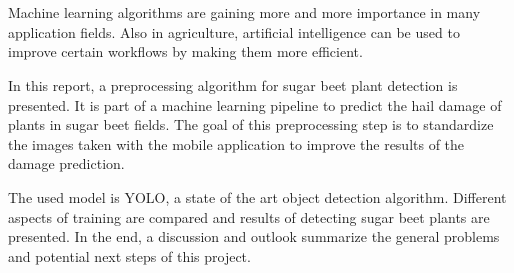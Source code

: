 \chapter{\abstractname}

Machine learning algorithms are gaining more and more importance in many application fields. Also in agriculture, artificial intelligence can be used to improve certain workflows by making them more efficient. 

In this report, a preprocessing algorithm for sugar beet plant detection is presented. It is part of a machine learning pipeline to predict the hail damage of plants in sugar beet fields. The goal of this preprocessing step is to standardize the images taken with the mobile application to improve the results of the damage prediction. 

The used model is YOLO, a state of the art object detection algorithm. Different aspects of training are compared and results of detecting sugar beet plants are presented. In the end, a discussion and outlook summarize the general problems and potential next steps of this project.